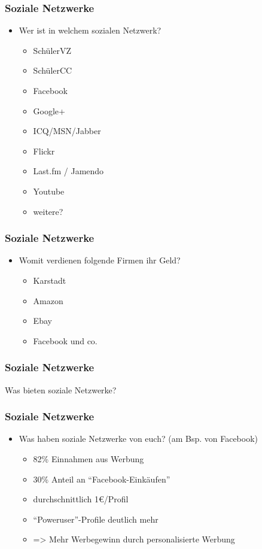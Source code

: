 \documentclass[12pt]{beamer}
\begin{document}
\begin{frame}
  \frametitle{Soziale Netzwerke}

  \begin{itemize}
    \item Wer ist in welchem sozialen Netzwerk?
      \begin{itemize}
        \item SchülerVZ
        \item SchülerCC
        \item Facebook
        \item Google+
        \item ICQ/MSN/Jabber
        \item Flickr
        \item Last.fm / Jamendo
        \item Youtube
        \item weitere?
      \end{itemize}
  \end{itemize}
\end{frame}

\begin{frame}
  \frametitle{Soziale Netzwerke}

  \begin{itemize}
    \item Womit verdienen folgende Firmen ihr Geld?
      \begin{itemize}
        \item<2-> Karstadt
        \item<3-> Amazon
        \item<4-> Ebay
        \item<5-> Facebook und co.
      \end{itemize}
  \end{itemize}
\end{frame}

\begin{frame}
  \frametitle{Soziale Netzwerke}

  \begin{center} \Large
     Was bieten soziale Netzwerke?
  \end{center}
\end{frame}

\begin{frame}
  \frametitle{Soziale Netzwerke}

  \begin{itemize}
    \item Was haben soziale Netzwerke von euch? (am Bsp. von Facebook)
      \begin{itemize}
        \item<2-> 82\% Einnahmen aus Werbung
        \item<3-> 30\% Anteil an "`Facebook-Einkäufen"'
        \item<4-> durchschnittlich 1€/Profil
        \item<5-> "`Poweruser"'-Profile deutlich mehr
        \item<6-> => Mehr Werbegewinn durch personalisierte Werbung
      \end{itemize}
  \end{itemize}
\end{frame}
\end{document}
